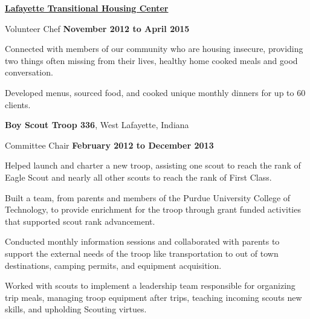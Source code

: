 \documentclass[10pt]{article}
\newcommand{\blankline}{\quad\pagebreak[3]}
\begin{document}
    \href{http://www.lthc.net/}{\textbf{Lafayette Transitional Housing Center}}
    \begin{outerlist}

        \item[] Volunteer Chef %
                \hfill \textbf{November 2012 to April 2015}

                \begin{innerlist}
                    \item Connected with members of our community who are housing insecure,
                          providing two things often missing from their lives, healthy home
                          cooked meals and good conversation.
                    \item Developed menus, sourced food, and cooked unique monthly dinners
                          for up to 60 clients.
                \end{innerlist}

    \end{outerlist}

    \blankline

    \textbf{Boy Scout Troop 336}, West Lafayette, Indiana
    \begin{outerlist}

        \item[] Committee Chair %
                \hfill \textbf{February 2012 to December 2013}

                \begin{innerlist}
                    \item Helped launch and charter a new troop, assisting one scout to
                          reach the rank of Eagle Scout and nearly all other scouts to reach
                          the rank of First Class.
                    \item Built a team, from parents and members of the Purdue University
                          College of Technology, to provide enrichment for the troop through
                          grant funded activities that supported scout rank advancement.
                    \item Conducted monthly information sessions and
                          collaborated with parents to support the external
                          needs of the troop like transportation to out of
                          town destinations, camping permits, and equipment
                          acquisition.
                    \item Worked with scouts to implement a leadership team
                          responsible for organizing trip meals, managing troop equipment
                          after trips, teaching incoming scouts new skills, and upholding
                          Scouting virtues.
                \end{innerlist}

    \end{outerlist}
\end{document}
